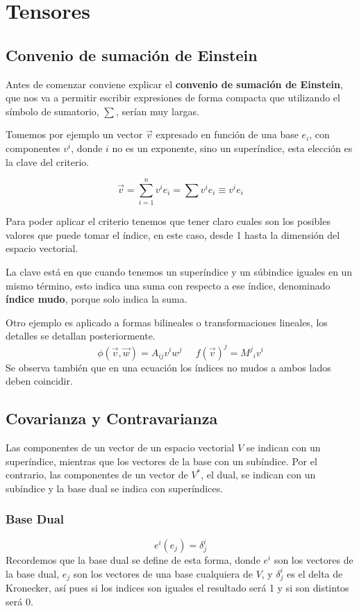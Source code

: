 \section{Tensores}
\subsection{Convenio de sumación de Einstein}
Antes de comenzar conviene explicar el \textbf{convenio de sumación de Einstein}, que nos va a permitir escribir expresiones de forma compacta que utilizando el símbolo de sumatorio, $\sum$, serían muy largas.

Tomemos por ejemplo un vector $\vec{v}$ expresado en función de una base $e_i$, con componentes $v^i$, donde $i$ no es un exponente, sino un superíndice, esta elección es la clave del criterio.

\[\vec{v}=\sum_{i=1}^n{v^i e_i}=\sum{v^i e_i}\equiv v^i e_i\]

Para poder aplicar el criterio tenemos que tener claro cuales son los posibles valores que puede tomar el índice, en este caso, desde 1 hasta la dimensión del espacio vectorial.

La clave está en que cuando tenemos un superíndice y un súbindice iguales en un mismo término, esto indica una suma con respecto a ese índice, denominado \textbf{índice mudo}, porque solo indica la suma.

Otro ejemplo es aplicado a formas bilineales o transformaciones lineales, los detalles se detallan posteriormente.
\[\phi(\vec{v},\vec{w})=A_{ij} v^i w^j \;\;\;\;\; {f(\vec{v})}^j={M^j}_i v^i\]
Se observa también que en una ecuación los índices no mudos a ambos lados deben coincidir.
\subsection{Covarianza y Contravarianza}
Las componentes de un vector de un espacio vectorial $V$ se indican con un superíndice, mientras que los vectores de la base con un subíndice. Por el contrario, las componentes de un vector de $V^*$, el dual, se indican con un subíndice y la base dual se indica con superíndices.
\subsubsection{Base Dual}
\vspace{-25pt}
\[e^i (e_j)= \delta^i_j\]
Recordemos que la base dual se define de esta forma, donde $e^i$ son los vectores de la base dual, $e_j$ son los vectores de una base cualquiera de $V$, y $\delta^i_j$ es el delta de Kronecker, así pues si los indices son iguales el resultado será 1 y si son distintos será 0.

